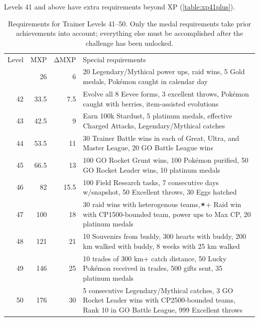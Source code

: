 Levels 41 and above have extra requirements beyond XP (\autoref{table:xp41plus}).
\begin{table}
\centering
  \begin{tabular}{rrrp{}}
Level & MXP & ΔMXP & Special requirements \\
\Midrule
41 & 26 & 6 & 20 Legendary/Mythical power ups,\newline
                      30 raid wins, 5 Gold medals,\newline
                      200 Pokémon caught in calendar day\\
42 & 33.5 & 7.5 & Evolve all 8 Eevee forms, 3 excellent throws,\newline
                      200 Pokémon caught with berries,\newline
                      15 item-assisted evolutions\\
43 & 42.5 & 9 & Earn 100k Stardust, 5 platinum medals,\newline
                      200 effective Charged Attacks,\newline
                      5 Legendary/Mythical catches \\
44 & 53.5 & 11 & 30 Trainer Battle wins in each of Great, Ultra, and Master League,
                       20 GO Battle League wins \\
45 & 66.5 & 13 & 100 GO Rocket Grunt wins,
                       100 Pokémon purified,
                       50 GO Rocket Leader wins,
                       10 platinum medals\\
46 & 82 & 15.5 & 100 Field Research tasks,
                       7 consecutive days w/snapshot,
                       50 Excellent throws,
                       30 Eggs hatched\\
47 & 100 & 18 & 30 raid wins with heterogenous teams,\newline
                        3🟉+ Raid win with CP1500-bounded team,\newline
                        3 power ups to Max CP, 20 platinum medals\\
48 & 121 & 21 & 10 Souvenirs from buddy,
                        300 hearts with buddy,
                        200 km walked with buddy,
                        8 weeks with 25 km walked\\
49 & 146 & 25 & 10 trades of 300 km+ catch distance,
                        50 Lucky Pokémon received in trades,
                        500 gifts sent,
                        35 platinum medals\\
50 & 176 & 30 & 5 consecutive Legendary/Mythical catches,
                        3 GO Rocket Leader wins with CP2500-bounded teams,
                        Rank 10 in GO Battle League,
                        999 Excellent throws\\
\end{tabular}
\caption[Requirements for Trainer Levels 41--50]{Requirements for Trainer Levels 41--50.
   Only the medal requirements take prior achievements into account; everything else
   must be accomplished after the challenge has been unlocked.\label{table:xp41plus}}
\end{table}
